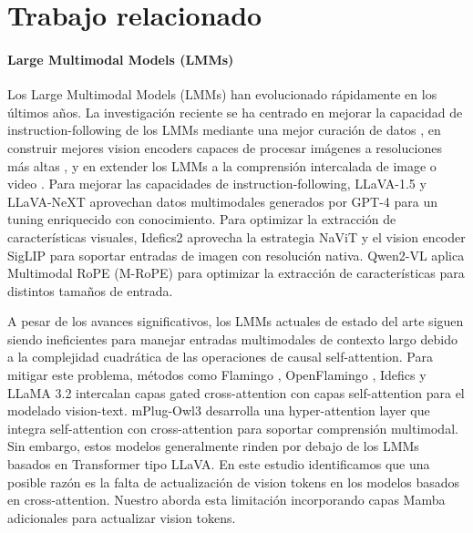 \section{Trabajo relacionado}
\label{sec:related_work}
\paragraph{Large Multimodal Models (LMMs)}
Los Large Multimodal Models (LMMs) han evolucionado rápidamente en los últimos años. La investigación reciente se ha centrado en mejorar la capacidad de instruction-following de los LMMs mediante una mejor curación de datos \cite{llavanext2024, li2024llavaov, chen2024sharegpt4v, li2024mvbench, ren2024vista, zhang2024video}, en construir mejores vision encoders capaces de procesar imágenes a resoluciones más altas \cite{llavanext2024, laurenccon2024matters, wang2024qwen2}, y en extender los LMMs a la comprensión intercalada de image \cite{laurenccon2024matters, li2024llava, jiang2024mantis} o video \cite{maaz2023video, lin2023video, zhang2024long}. Para mejorar las capacidades de instruction-following, LLaVA-1.5 \cite{liu2024improved} y LLaVA-NeXT \cite{llavanext2024} aprovechan datos multimodales generados por GPT-4 para un tuning enriquecido con conocimiento. Para optimizar la extracción de características visuales, Idefics2 \cite{laurenccon2024matters} aprovecha la estrategia NaViT \cite{dehghani2023patch} y el vision encoder SigLIP \cite{zhai2023sigmoid} para soportar entradas de imagen con resolución nativa. Qwen2-VL \cite{wang2024qwen2} aplica Multimodal RoPE (M-RoPE) para optimizar la extracción de características para distintos tamaños de entrada.

A pesar de los avances significativos, los LMMs actuales de estado del arte siguen siendo ineficientes para manejar entradas multimodales de contexto largo debido a la complejidad cuadrática de las operaciones de causal self-attention. Para mitigar este problema, métodos como Flamingo \cite{alayrac2022flamingo}, OpenFlamingo \cite{awadalla2023openflamingo}, Idefics \cite{laurenccon2023obelics} y LLaMA 3.2 \cite{dubey2024llama} intercalan capas gated cross-attention con capas self-attention para el modelado vision-text. mPlug-Owl3 \cite{ye2024mplug} desarrolla una hyper-attention layer que integra self-attention con cross-attention para soportar comprensión multimodal. Sin embargo, estos modelos generalmente rinden por debajo de los LMMs basados en Transformer tipo LLaVA. En este estudio identificamos que una posible razón es la falta de actualización de vision tokens en los modelos basados en cross-attention. Nuestro \model aborda esta limitación incorporando capas Mamba adicionales para actualizar vision tokens.


